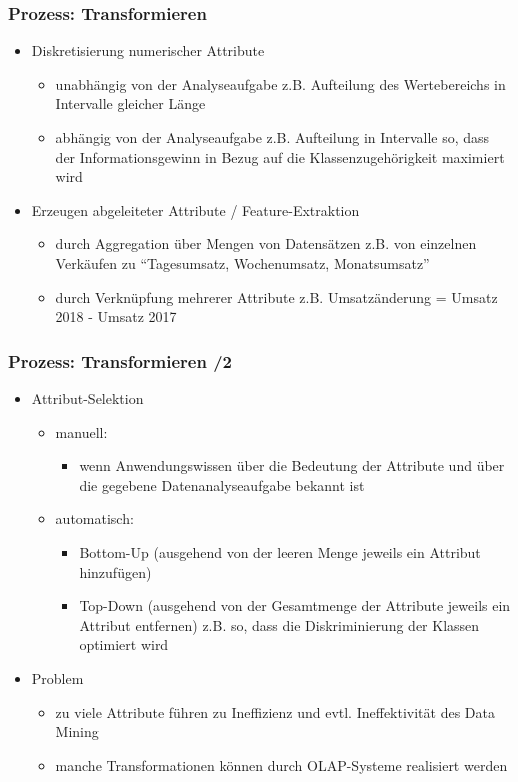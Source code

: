 \begin{frame}
\frametitle{Prozess: Transformieren}

\begin{itemize}
\item Diskretisierung numerischer Attribute
\begin{itemize}
\item unabhängig von der Analyseaufgabe
z.B. Aufteilung des Wertebereichs in Intervalle gleicher Länge
\item abhängig von der Analyseaufgabe
z.B. Aufteilung in Intervalle so, dass der Informationsgewinn in Bezug auf die
Klassenzugehörigkeit maximiert wird
\end{itemize}

\item Erzeugen abgeleiteter Attribute / Feature-Extraktion
\begin{itemize}
\item durch Aggregation über Mengen von Datensätzen
z.B. von einzelnen Verkäufen zu "`Tagesumsatz, Wochenumsatz, Monatsumsatz"'
\item durch Verknüpfung mehrerer Attribute
z.B. Umsatzänderung = Umsatz 2018 - Umsatz 2017
\end{itemize}
\end{itemize}

\end{frame}


\begin{frame}
\frametitle{Prozess: Transformieren /2}

\begin{itemize}
\item Attribut-Selektion
\begin{itemize}
\item manuell:
\begin{itemize}
\item wenn Anwendungswissen über die Bedeutung der Attribute und über die
gegebene Datenanalyseaufgabe bekannt ist
\end{itemize}
\item automatisch:
\begin{itemize}
\item Bottom-Up (ausgehend von der leeren Menge jeweils ein Attribut
hinzufügen)
\item Top-Down (ausgehend von der Gesamtmenge der Attribute jeweils
  ein Attribut entfernen) z.B. so, dass die Diskriminierung der
  Klassen optimiert wird
\end{itemize}
\end{itemize}
\item Problem
\begin{itemize}
\item zu viele Attribute führen zu Ineffizienz und evtl. Ineffektivität
  des Data Mining
\item manche Transformationen können durch OLAP-Systeme realisiert
  werden
\end{itemize}
\end{itemize}

\end{frame}

